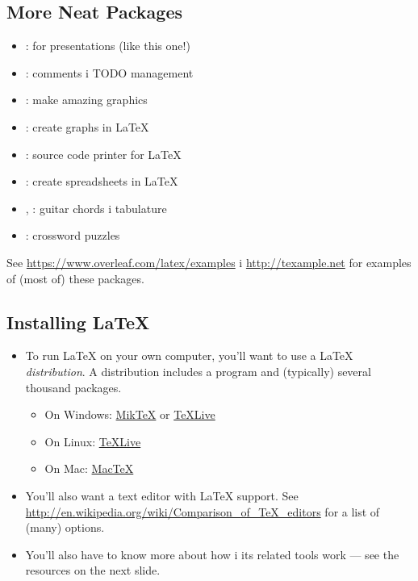 \documentclass{beamer}
\begin{document}
\subsection{More Neat Packages}
\begin{frame}{\insertsubsection}
\begin{itemize}
\item {}: for presentations (like this one!)
\item {}: comments i TODO management
\item {}: make amazing graphics
\item {}: create graphs in \LaTeX
\item {}: source code printer for \LaTeX
\item {}: create spreadsheets in \LaTeX
\item {}, : guitar chords i tabulature
\item {}: crossword puzzles
\end{itemize}
See \url{https://www.overleaf.com/latex/examples} i \url{http://texample.net}
for examples of (most of) these packages.
\end{frame}

\subsection{Installing \LaTeX{}}
\begin{frame}{\insertsubsection}
\begin{itemize}
\item To run \LaTeX{} on your own computer, you'll want to use a \LaTeX{}
\emph{distribution}. A distribution includes a  program
and (typically) several thousand packages.
\begin{itemize}
\item On Windows: \href{http://miktex.org/}{Mik\TeX} or \href{http://tug.org/texlive/}{\TeX Live}
\item On Linux: \href{http://tug.org/texlive/}{\TeX Live}
\item On Mac: \href{http://tug.org/mactex/}{Mac\TeX}
\end{itemize}
\item You'll also want a text editor with \LaTeX{} support. See \url{http://en.wikipedia.org/wiki/Comparison_of_TeX_editors} for a list of (many) options.
\item You'll also have to know more about how  i its related tools
work --- see the resources on the next slide.
\end{itemize}
\end{frame}
\end{document}
